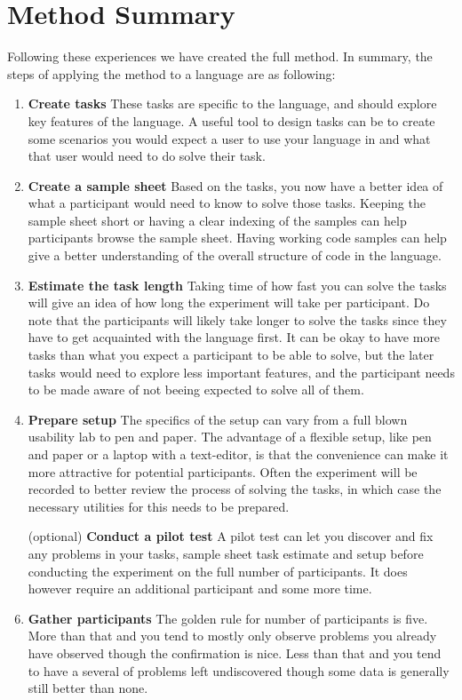 \section{Method Summary}
\label{section:MethodSummary}
Following these experiences we have created the full method.
In summary, the steps of applying the method to a language are as following:

\begin{enumerate}
\item \textbf{Create tasks} These tasks are specific to the language, and should explore key features of the language. A useful tool to design tasks can be to create some scenarios you would expect a user to use your language in and what that user would need to do solve their task.
\item \textbf{Create a sample sheet} Based on the tasks, you now have a better idea of what a participant would need to know to solve those tasks. Keeping the sample sheet short or having a clear indexing of the samples can help participants browse the sample sheet. Having working code samples can help give a better understanding of the overall structure of code in the language.
\item \textbf{Estimate the task length} Taking time of how fast you can solve the tasks will give an idea of how long the experiment will take per participant. Do note that the participants will likely take longer to solve the tasks since they have to get acquainted with the language first. It can be okay to have more tasks than what you expect a participant to be able to solve, but the later tasks would need to explore less important features, and the participant needs to be made aware of not beeing expected to solve all of them.
\item \textbf{Prepare setup} The specifics of the setup can vary from a full blown usability lab to pen and paper. The advantage of a flexible setup, like pen and paper or a laptop with a text-editor, is that the convenience can make it more attractive for potential participants. Often the experiment will be recorded to better review the process of solving the tasks, in which case the necessary utilities for this needs to be prepared.
\item[(optional)] \textbf{Conduct a pilot test} A pilot test can let you discover and fix any problems in your tasks, sample sheet task estimate and setup before conducting the experiment on the full number of participants. It does however require an additional participant and some more time.
\item \textbf{Gather participants} The golden rule for number of participants is five. More than that and you tend to mostly only observe problems you already have observed though the confirmation is nice. Less than that and you tend to have a several of problems left undiscovered though some data is generally still better than none.

\end{enumerate}
